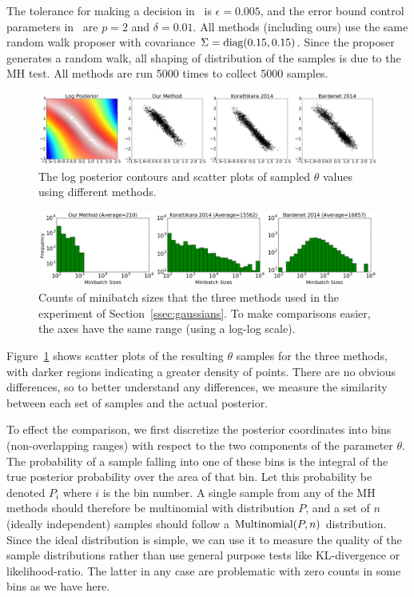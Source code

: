 \documentclass{article}
\begin{document}
The tolerance for making a decision in~\cite{cutting_mh_2014} is
$\epsilon=0.005$, and the error bound control parameters
in~\cite{icml2014c1_bardenet14} are $p = 2$ and $\delta = 0.01$.  All methods
(including ours) use the same random walk proposer with covariance $\Sigma={\rm
diag}(0.15, 0.15)$.  Since the proposer generates a random walk, all shaping of
distribution of the samples is due to the MH test. All methods are run 5000
times to collect 5000 samples.

\begin{figure}[t]
    \centering
    \includegraphics[width=1\linewidth]{GaussianMixtureResult/posterior_of_gaussian.png}
    \caption{
    The log posterior contours and scatter plots of sampled $\theta$ values
    using different methods. 
    }
    \label{fig:gauss_mix_1}
\end{figure}

\begin{figure}[t]
    \centering
    \includegraphics[width=1\linewidth]{minibatch_size_gaussian.png}
    \caption{
    Counts of minibatch sizes that the three methods used in the experiment of
    Section~\ref{ssec:gaussians}. To make comparisons easier, the axes have the
    same range (using a log-log scale).
    }
    \label{fig:gauss_mix_2}
\end{figure}

Figure~\ref{fig:gauss_mix_1} shows scatter plots of the resulting $\theta$
samples for the three methods, with darker regions indicating a greater density
of points. There are no obvious differences, so to better understand any
differences, we measure the similarity between each set of samples and the
actual posterior. 

To effect the comparison, we first discretize the posterior coordinates into
bins (non-overlapping ranges) with respect to the two components of the
parameter $\theta$.  The probability of a sample falling into one of these bins
is the integral of the true posterior probability over the area of that bin. Let
this probability be denoted $P_i$ where $i$ is the bin number. A single sample
from any of the MH methods should therefore be multinomial with distribution
$P$, and a set of $n$ (ideally independent) samples should follow a ${\rm
Multinomial}(P,n)$ distribution.  Since the ideal distribution is simple, we can
use it to measure the quality of the sample distributions rather than use
general purpose tests like KL-divergence or likelihood-ratio.  The latter in any
case are problematic with zero counts in some bins as we have here.
\end{document}
